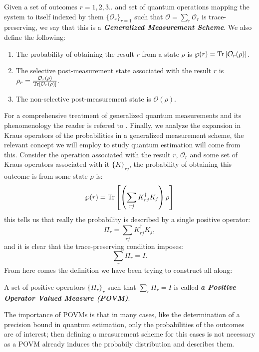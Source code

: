 \begin{definition}
  Given a set of outcomes $r=1,2,3..$ and set of quantum operations  mapping the system to itself indexed by them $\{\mathcal{O}_{r}\}_{r=1}$  such that $\mathcal{O}=\sum_{r}\mathcal{O}_{r}$ is trace-preserving, we say that this is a \textit{\textbf{Generalized Measurement Scheme}}.
  We also define the following:
  \begin{enumerate}
    \item The probability of obtaining the result $r$ from a state $\rho$ is $\wp(r) = \mathrm{Tr}\left[\mathcal{O}_{r}(\rho)\right]$.
    \item The selective post-measurement state associated with the result $r$ is $\rho_{r} = \frac{\mathcal{O}_{r}(\rho)}{\mathrm{Tr}\left[\mathcal{O}_{r}(\rho)\right]}$.
    \item The non-selective post-measurement state is $\mathcal{O}(\rho)$.
  \end{enumerate}
\end{definition}
For a comprehensive treatment of generalized quantum measurements and its phenomenology the reader is refered to \cite{wiseman_quantum_2010}.
Finally, we analyze the expansion in Kraus operators of the probabilities in a generalized measurement scheme, the relevant concept
we will employ to study quantum estimation will come from this. Consider the operation associated with the result $r$, $\mathcal{O}_{r}$
and some set of Kraus operators associated with it $\{K\}_{rj}$, the probability of obtaining this outcome is from some state $\rho$ is:
\begin{equation}
  \wp(r) = \mathrm{Tr}\left[\left(\sum_{rj}K_{rj}^{\dagger}K_{j}\right)\rho\right]
\end{equation}
this tells us that really the probability is described by a single positive operator:
\begin{equation}\label{eq:sum_POVM}
\Pi_{r} = \sum_{rj}K_{rj}^{\dagger}K_{j},
\end{equation}
and it is clear that the trace-preserving condition imposes:
\begin{equation}\label{eq:sum_POVM}
\sum_{r}\Pi_{r} = I.
\end{equation}
From here comes the definition we have been trying to construct all along:

\begin{definition}
  A set of positive operators $\{\Pi_{r}\}_{r}$ such that $\sum_{r}\Pi_{r}=I$ is called \textit{\textbf{a Positive Operator Valued Measure (POVM)}}.
\end{definition}
The importance of POVMs is that in many cases, like the determination of a precision bound in  quantum estimation, only the probabilities of the outcomes are of interest; then defining a measurement scheme for this cases is not necessary as a POVM already induces the probabily distribution and describes them.


